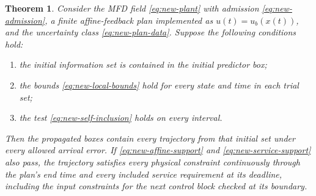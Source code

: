 \documentclass[final]{cas-sc}
\theoremstyle{definition}
\theoremstyle{plain}
\newtheorem{theorem}{Theorem}
\theoremstyle{definition}
\theoremstyle{plain}
\begin{document}
\begin{theorem}
\label{thm:new-plan-enclosure}
Consider the MFD field \eqref{eq:new-plant} with admission
\eqref{eq:new-admission}, a finite affine-feedback plan
implemented as $u(t)=u_b(x(t))$, and the uncertainty class
\eqref{eq:new-plan-data}. Suppose the following conditions hold:
\begin{enumerate}
\renewcommand{\labelenumi}{(\alph{enumi})}
\item the initial information set is contained in the initial
predictor box;
\item the bounds \eqref{eq:new-local-bounds} hold for every state and
time in each trial set;
\item the test \eqref{eq:new-self-inclusion} holds on every interval.
\end{enumerate}
Then the propagated boxes contain every trajectory from that initial
set under every allowed arrival error. If \eqref{eq:new-affine-support}
and \eqref{eq:new-service-support} also pass, the trajectory satisfies every
physical constraint continuously through the plan's end time and every
included service requirement at its deadline, including the input
constraints for the next control block checked at its boundary.
\end{theorem}
\end{document}
